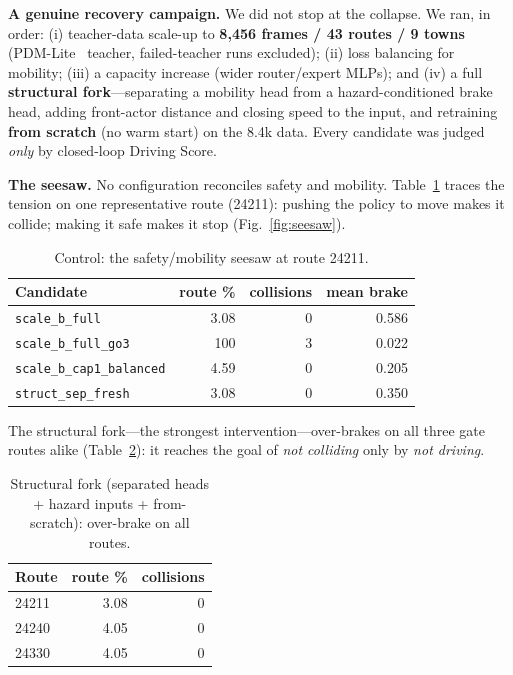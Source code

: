 \documentclass[10pt]{article}
\begin{document}
\textbf{A genuine recovery campaign.} We did not stop at the collapse. We ran, in order: (i)
teacher-data scale-up to \textbf{8{,}456 frames / 43 routes / 9 towns} (PDM-Lite~\cite{pdmlite}
teacher, failed-teacher runs excluded); (ii) loss balancing for mobility; (iii) a capacity increase
(wider router/expert MLPs); and (iv) a full \textbf{structural fork}---separating a mobility head from
a hazard-conditioned brake head, adding front-actor distance and closing speed to the input, and
retraining \textbf{from scratch} (no warm start) on the 8.4k data. Every candidate was judged
\emph{only} by closed-loop Driving Score.

\textbf{The seesaw.} No configuration reconciles safety and mobility. Table~\ref{tab:seesaw} traces
the tension on one representative route (24211): pushing the policy to move makes it collide; making
it safe makes it stop (Fig.~\ref{fig:seesaw}).

\begin{table}[ht]
\centering
\caption{Control: the safety/mobility seesaw at route 24211.}
\label{tab:seesaw}
\begin{tabular}{lrrr}
\toprule
Candidate & route \% & collisions & mean brake \\
\midrule
\texttt{scale\_b\_full}          & 3.08 & 0 & 0.586 \\
\texttt{scale\_b\_full\_go3}     & 100  & 3 & 0.022 \\
\texttt{scale\_b\_cap1\_balanced}& 4.59 & 0 & 0.205 \\
\texttt{struct\_sep\_fresh}      & 3.08 & 0 & 0.350 \\
\bottomrule
\end{tabular}
\end{table}

The structural fork---the strongest intervention---over-brakes on all three gate routes alike
(Table~\ref{tab:fork}): it reaches the goal of \emph{not colliding} only by \emph{not driving}.

\begin{table}[ht]
\centering
\caption{Structural fork (separated heads + hazard inputs + from-scratch): over-brake on all routes.}
\label{tab:fork}
\begin{tabular}{lrr}
\toprule
Route & route \% & collisions \\
\midrule
24211 & 3.08 & 0 \\
24240 & 4.05 & 0 \\
24330 & 4.05 & 0 \\
\bottomrule
\end{tabular}
\end{table}
\end{document}
